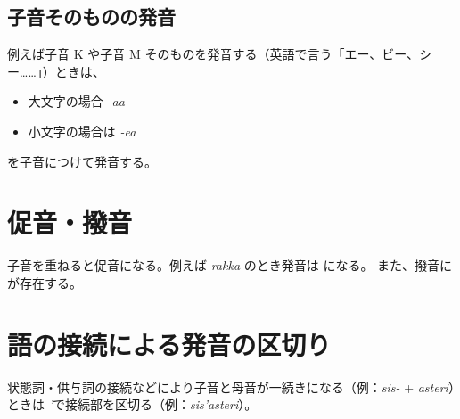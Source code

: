 \subsection{子音そのものの発音}

例えば子音 K や子音 M そのものを発音する（英語で言う「エー、ビー、シー……」）ときは、
\begin{itemize}
    \item 大文字の場合 \emph{-aa}
    \item 小文字の場合は \emph{-ea}
\end{itemize}
を子音につけて発音する。

\section{促音・撥音}

子音を重ねると促音になる。例えば \emph{rakka} のとき発音は  になる。
また、撥音に  が存在する。

\section{語の接続による発音の区切り}

状態詞・供与詞の接続などにより子音と母音が一続きになる（例：\emph{sis-} + \emph{asteri}）ときは \emph{'}で接続部を区切る（例：\emph{sis'asteri}）。